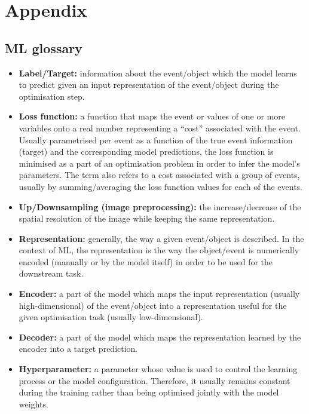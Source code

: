 \chapter{Appendix}

\section{ML glossary}\label{app:glossary}
\begin{itemize}
    \item[] \textbf{Label/Target:} information about the event/object which the model learns to predict given an input representation of the event/object during the optimisation step. 
    
    \item[] \textbf{Loss function:} a function that maps the event or values of one or more variables onto a real number representing a \enquote{cost} associated with the event. Usually parametrised per event as a function of the true event information (target) and the corresponding model predictions, the loss function is minimised as a part of an optimisation problem in order to infer the model's parameters. The term also refers to a cost associated with a group of events, usually by summing/averaging the loss function values for each of the events.
    
    \item[] \textbf{Up/Downsampling (image preprocessing):} the increase/decrease of the spatial resolution of the image while keeping the same representation.
    
    \item[] \textbf{Representation:} generally, the way a given event/object is described. In the context of ML, the representation is the way the object/event is numerically encoded (manually or by the model itself) in order to be used for the downstream task.   
    
    \item[] \textbf{Encoder:} a part of the model which maps the input representation (usually high-dimensional) of the event/object into a representation useful for the given optimisation task (usually low-dimensional).
    
    \item[] \textbf{Decoder:} a part of the model which maps the representation learned by the encoder into a target prediction. 

    \item[] \textbf{Hyperparameter:} a parameter whose value is used to control the learning process or the model configuration. Therefore, it usually remains constant during the training rather than being optimised jointly with the model weights.


\end{itemize}
